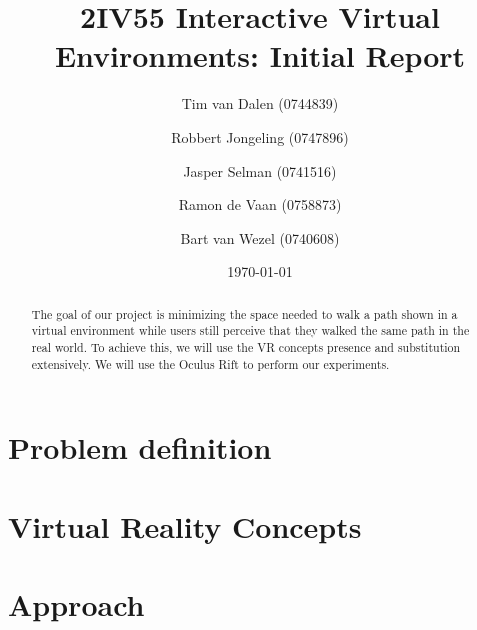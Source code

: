\documentclass[a4paper,11pt]{article}
\title{
	2IV55 Interactive Virtual Environments: Initial Report
}
\author{
	Tim van Dalen (0744839)
	\and
	Robbert Jongeling (0747896)
	\and
	Jasper Selman (0741516)
	\and
	Ramon de Vaan (0758873)
	\and
	Bart van Wezel (0740608)
}
\date{\today}
\begin{document}
	\maketitle
	
	\begin{abstract}
		The goal of our project is minimizing the space needed to walk a path shown in a virtual environment while users still perceive that they walked the same path in the real world.
		To achieve this, we will use the VR concepts presence and substitution extensively.
		We will use the Oculus Rift to perform our experiments.
	\end{abstract}
	
	\section{Problem definition}
	\label{sec:problem}
	
	
	\section{Virtual Reality Concepts}
	\label{sec:vr}
	
	
	\section{Approach}
	\label{sec:approach}
	
	
	
\end{document}
